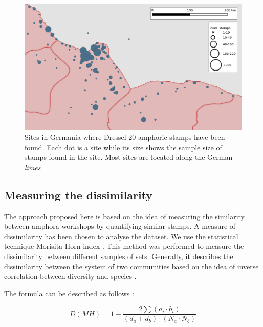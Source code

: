 \documentclass[review]{elsarticle}
\newcommand{\memo}[2]{\textcolor{#1}{#2}}
\newcommand{\xavi}[1]{\memo{magenta}{XRC: #1\\}}
\begin{document}
 
\begin{figure}[htp]
	\centering
\includegraphics[width=\linewidth]{figs/germania}
\caption{Sites in Germania where Dressel-20 amphoric stamps have been found. Each dot is a site while its size shows the sample size of stamps found in the site. Most sites are located along the German \textit{limes}}
\label{germania}
\end{figure}


\subsection{Measuring the dissimilarity}



The approach proposed here is based on the idea of measuring the similarity between amphora workshops by quantifying similar stamps. A measure of dissimilarity has been chosen to analyse the dataset. We use the statistical technique Morisita-Horn index \citep{morisita_measuring_1959, horn_measurement_1966}. This method was performed to measure the dissimilarity between different samples of sets. Generally, it describes the dissimilarity between the system of two communities based on the idea of inverse correlation between diversity and species \citep{magurran_why_1988}.

The formula can be described as follows \citep{magurran_measuring_2013}:

\begin{equation}
D(MH) = 1- \frac{2 \sum(a_{i} \cdot b_{i})}{(d_{a} + d_{b}) \cdot (N_{a} \cdot N_{b})}
\end{equation} \\
\end{document}
